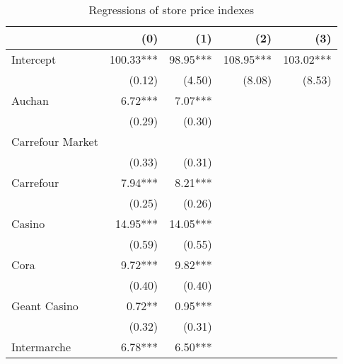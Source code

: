 \documentclass[english]{article}
\begin{document}
\begin{table}[htbp]
\caption{Regressions of store price indexes}
\label{tab:reg_store_price_indexes}
\begin{threeparttable}
\begin{tabular}{lrrrr}
\toprule
\toprule
                                                        & (0)       & (1)      & (2)       & (3)        \\
\midrule
Intercept                                               & 100.33*** & 98.95*** & 108.95*** & 103.02***  \\
                                                        & (0.12)    & (4.50)   & (8.08)    & (8.53)     \\
Auchan                                                  & 6.72***   & 7.07***  &           &            \\
                                                        & (0.29)    & (0.30)   &           &            \\
Carrefour Market                                        &            \\
                                                        & (0.33)    & (0.31)   &           &            \\
Carrefour                                               & 7.94***   & 8.21***  &           &            \\
                                                        & (0.25)    & (0.26)   &           &            \\
Casino                                                  & 14.95***  & 14.05*** &           &            \\
                                                        & (0.59)    & (0.55)   &           &            \\
Cora                                                    & 9.72***   & 9.82***  &           &            \\
                                                        & (0.40)    & (0.40)   &           &            \\
Geant Casino                                            & 0.72**    & 0.95***  &           &            \\
                                                        & (0.32)    & (0.31)   &           &            \\
Intermarche                                             & 6.78***   & 6.50***  &           &            \\

\end{tabular}
\end{threeparttable}
\end{table}
\end{document}
